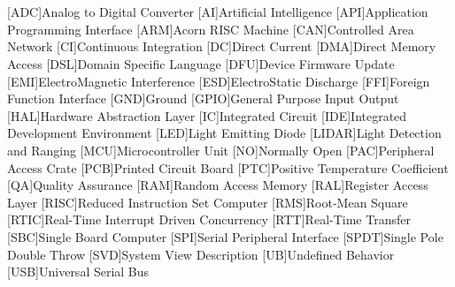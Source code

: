 \cleardoublepage
\chapter*{\listofabbrevname}
{}

\begin{acronym}[KolikMista]

	[ADC]{Analog to Digital Converter}
	[AI]{Artificial Intelligence}
	[API]{Application Programming Interface}
	[ARM]{Acorn RISC Machine}
	[CAN]{Controlled Area Network}
	[CI]{Continuous Integration}
	[DC]{Direct Current}
	[DMA]{Direct Memory Access}
	[DSL]{Domain Specific Language}
	[DFU]{Device Firmware Update}
	[EMI]{ElectroMagnetic Interference}
	[ESD]{ElectroStatic Discharge}
	[FFI]{Foreign Function Interface}
	[GND]{Ground}
	[GPIO]{General Purpose Input Output}
	[HAL]{Hardware Abstraction Layer}
	[IC]{Integrated Circuit}
	[IDE]{Integrated Development Environment}
	[LED]{Light Emitting Diode}
	[LIDAR]{Light Detection and Ranging}
	[MCU]{Microcontroller Unit}
	[NO]{Normally Open}
	[PAC]{Peripheral Access Crate}
	[PCB]{Printed Circuit Board}
	[PTC]{Positive Temperature Coefficient}
	[QA]{Quality Assurance}
	[RAM]{Random Access Memory}
	[RAL]{Register Access Layer}
	[RISC]{Reduced Instruction Set Computer}
	[RMS]{Root-Mean Square}
	[RTIC]{Real-Time Interrupt Driven Concurrency}
	[RTT]{Real-Time Transfer}
	[SBC]{Single Board Computer}
	[SPI]{Serial Peripheral Interface}
	[SPDT]{Single Pole Double Throw}
	[SVD]{System View Description}
	[UB]{Undefined Behavior}
	[USB]{Universal Serial Bus}


\end{acronym}
